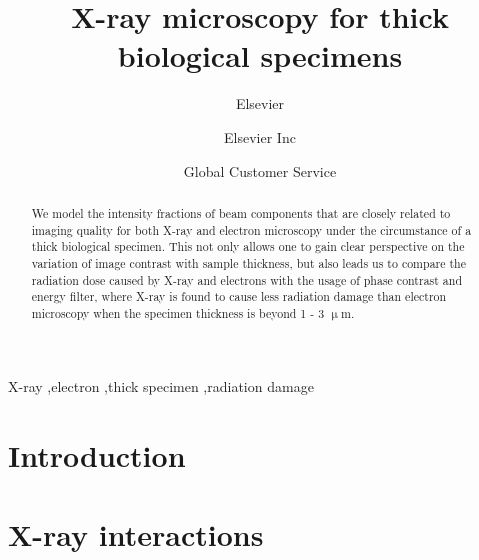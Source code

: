 \documentclass[review]{elsarticle}
\newcommand\micron{$\upmu$m}
\begin{document}
\begin{frontmatter}

\title{X-ray microscopy for thick biological specimens}

\author{Elsevier}
\address{Radarweg 29, Amsterdam}

\author[mymainaddress,mysecondaryaddress]{Elsevier Inc}

\author[mysecondaryaddress]{Global Customer Service}

\address[mymainaddress]{1600 John F Kennedy Boulevard, Philadelphia}
\address[mysecondaryaddress]{360 Park Avenue South, New York}


\begin{abstract}
We model the intensity fractions of beam components that are closely related to imaging quality for both X-ray and electron microscopy under the circumstance of a thick biological specimen. This not only allows one to gain clear perspective on the variation of image contrast with sample thickness, but also leads us to compare the radiation dose caused by X-ray and electrons with the usage of phase contrast and energy filter, where X-ray is found to cause less radiation damage than electron microscopy when the specimen thickness is beyond 1 - 3 \micron. 
\end{abstract}

\begin{keyword}
X-ray \sep electron \sep thick specimen \sep radiation damage
\end{keyword}

\end{frontmatter}

\linenumbers

\section{Introduction}

\section{X-ray interactions}
\end{document}
